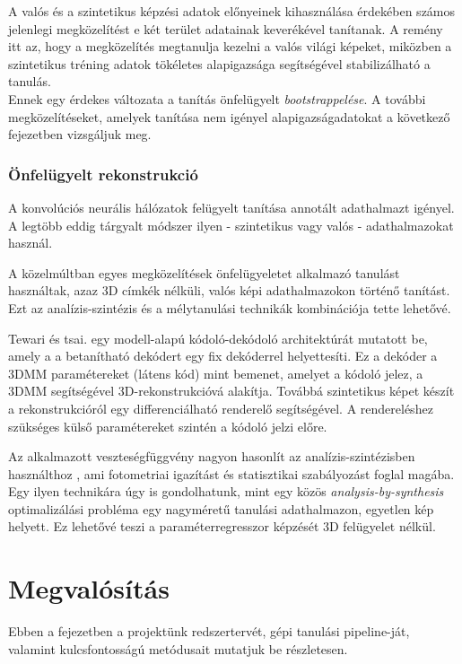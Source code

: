 \documentclass[12pt,a4]{article}
\begin{document}
	
	A valós és a szintetikus képzési adatok előnyeinek kihasználása érdekében számos jelenlegi megközelítést e két terület adatainak keverékével tanítanak. A remény itt az, hogy a megközelítés megtanulja kezelni a valós világi
	képeket, miközben a szintetikus tréning adatok tökéletes alapigazsága
	segítségével stabilizálható a tanulás.\\


	Ennek egy érdekes változata
	a tanítás önfelügyelt \textit{bootstrappelése}. A további megközelítéseket, amelyek tanítása nem igényel
	alapigazságadatokat a következő fejezetben vizsgáljuk meg.
	
	\subsubsection{Önfelügyelt rekonstrukció}
	A konvolúciós neurális hálózatok felügyelt tanítása annotált adathalmazt igényel. A legtöbb
	eddig tárgyalt módszer ilyen - szintetikus vagy valós - adathalmazokat használ.
	
	\cite{3dmm}
	A közelmúltban egyes megközelítések önfelügyeletet alkalmazó
	tanulást használtak, azaz 3D címkék nélküli, valós képi adathalmazokon történő tanítást.
	Ezt az analízis-szintézis és a mélytanulási technikák kombinációja tette lehetővé.
	
	
	Tewari és tsai. \cite{tewari} egy modell-alapú kódoló-dekódoló architektúrát mutatott be, amely a
	a betanítható dekódert egy fix dekóderrel helyettesíti. Ez a dekóder a 3DMM paramétereket (látens kód)
	mint bemenet, amelyet a kódoló jelez, a 3DMM segítségével 3D-rekonstrukcióvá alakítja.
	Továbbá szintetikus képet készít a rekonstrukcióról egy differenciálható renderelő segítségével.
	A rendereléshez szükséges külső paramétereket szintén a kódoló jelzi előre. 
	
	
	Az alkalmazott veszteségfüggvény nagyon hasonlít az analízis-szintézisben használthoz \cite{3dmm}, ami fotometriai igazítást és statisztikai szabályozást foglal magába. Egy ilyen technikára úgy is gondolhatunk, mint egy közös
	\textit{analysis-by-synthesis} optimalizálási probléma egy nagyméretű tanulási
	adathalmazon, egyetlen kép helyett. Ez lehetővé teszi a paraméterregresszor képzését 3D felügyelet nélkül.
	
	\newpage
	\section{Megvalósítás}
	
	Ebben a fejezetben a projektünk redszertervét, gépi tanulási pipeline-ját, valamint kulcsfontosságú metódusait mutatjuk be részletesen.
	
\end{document}
